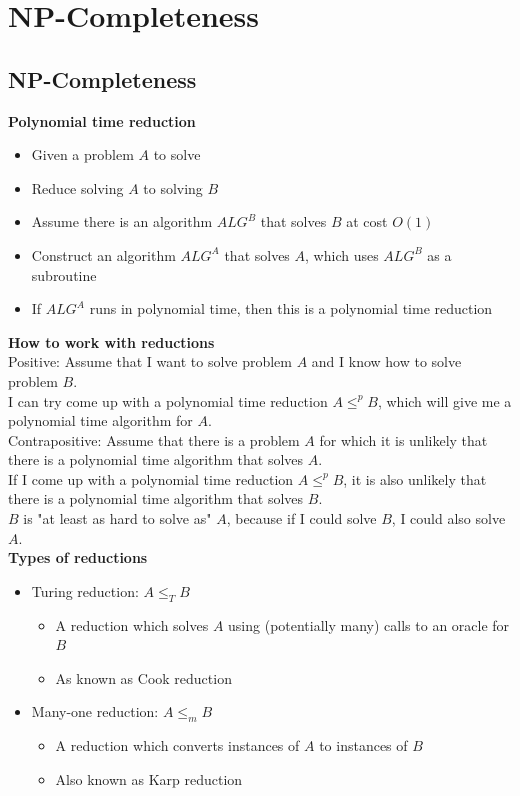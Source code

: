 \documentclass[onecolumn]{report}
\begin{document}
\chapter{NP-Completeness}
\section{NP-Completeness}
\textbf{Polynomial time reduction}
\begin{itemize}
    \item Given a problem $A$ to solve
    \item Reduce solving $A$ to solving $B$
    \item Assume there is an algorithm $ALG^B$ that solves $B$ at cost $O(1)$
    \item Construct an algorithm $ALG^A$ that solves $A$, which uses $ALG^B$ as a subroutine
    \item If $ALG^A$ runs in polynomial time, then this is a polynomial time reduction
\end{itemize}
\textbf{How to work with reductions}\\
Positive: Assume that I want to solve problem $A$ and I know how to solve problem $B$.\\
\indent I can try come up with a polynomial time reduction $A \leq^p B$, which will give me a polynomial time algorithm for $A$.\\
Contrapositive: Assume that there is a problem $A$ for which it is unlikely that there is a polynomial time algorithm that solves $A$.\\
\indent If I come up with a polynomial time reduction $A \leq^p B$, it is also unlikely that there is a polynomial time algorithm that solves $B$.\\
\indent $B$ is "at least as hard to solve as" $A$, because if I could solve $B$, I could also solve $A$.\\ 
\textbf{Types of reductions}
\begin{itemize}
    \item Turing reduction: $A \leq_T B$
    \begin{itemize}
        \item A reduction which solves $A$ using (potentially many) calls to an oracle for $B$
        \item As known as Cook reduction
    \end{itemize}
    \item Many-one reduction: $A \leq_m B$
    \begin{itemize}
        \item A reduction which converts instances of $A$ to instances of $B$
        \item Also known as Karp reduction
    \end{itemize}
\end{itemize}
\end{document}
